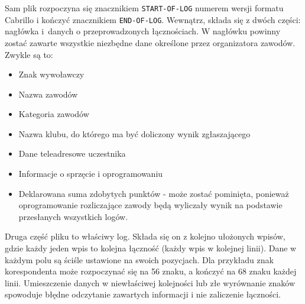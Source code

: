 \documentclass[]{mgr}
\begin{document}
            Sam plik rozpoczyna się znacznikiem \texttt{START-OF-LOG} numerem wersji formatu Cabrillo i kończyć znacznikiem \texttt{END-OF-LOG}. Wewnątrz, składa się z dwóch części: nagłówka i~danych o przeprowadzonych łącznościach. W nagłówku powinny zostać zawarte wszystkie niezbędne dane określone przez organizatora zawodów. Zwykle są to:
            \begin{itemize}
                \item Znak wywoławczy
                \item Nazwa zawodów
                \item Kategoria zawodów
                \item Nazwa klubu, do którego ma być doliczony wynik zgłaszającego
                \item Dane teleadresowe uczestnika
                \item Informacje o sprzęcie i oprogramowaniu
                \item Deklarowana suma zdobytych punktów - może zostać pominięta, ponieważ oprogramowanie rozliczające zawody będą wyliczały wynik na podstawie przesłanych wszystkich logów.
            \end{itemize}
            Druga część pliku to właściwy log. Składa się on z kolejno ułożonych wpisów, gdzie każdy jeden wpis to kolejna łączność (każdy wpis w kolejnej linii). Dane w każdym polu są ściśle ustawione na swoich pozycjach. Dla przykładu znak korespondenta może rozpoczynać się na 56 znaku, a kończyć na 68 znaku każdej linii. Umieszczenie danych w niewłaściwej kolejności lub złe wyrównanie znaków spowoduje błędne odczytanie zawartych informacji i nie zaliczenie łączności.
\end{document}
